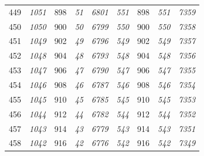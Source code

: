 \documentclass[10pt,fleqn]{article}
\begin{document}
\begin{longtable}{c|cccccccc}
449 & {\color{blue} \it 1051 \rm} & {\color{black} 898} & {\color{blue} \it 51 \rm} & {\color{blue} \it 6801 \rm} & {\color{blue} \it 551 \rm} & {\color{black} 898} & {\color{blue} \it 551 \rm} & {\color{blue} \it 7359 \rm} \\
450 & {\color{blue} \it 1050 \rm} & {\color{black} 900} & {\color{blue} \it 50 \rm} & {\color{blue} \it 6799 \rm} & {\color{blue} \it 550 \rm} & {\color{black} 900} & {\color{blue} \it 550 \rm} & {\color{blue} \it 7358 \rm} \\
451 & {\color{blue} \it 1049 \rm} & {\color{black} 902} & {\color{blue} \it 49 \rm} & {\color{blue} \it 6796 \rm} & {\color{blue} \it 549 \rm} & {\color{black} 902} & {\color{blue} \it 549 \rm} & {\color{blue} \it 7357 \rm} \\
452 & {\color{blue} \it 1048 \rm} & {\color{black} 904} & {\color{blue} \it 48 \rm} & {\color{blue} \it 6793 \rm} & {\color{blue} \it 548 \rm} & {\color{black} 904} & {\color{blue} \it 548 \rm} & {\color{blue} \it 7356 \rm} \\
453 & {\color{blue} \it 1047 \rm} & {\color{black} 906} & {\color{blue} \it 47 \rm} & {\color{blue} \it 6790 \rm} & {\color{blue} \it 547 \rm} & {\color{black} 906} & {\color{blue} \it 547 \rm} & {\color{blue} \it 7355 \rm} \\
454 & {\color{blue} \it 1046 \rm} & {\color{black} 908} & {\color{blue} \it 46 \rm} & {\color{blue} \it 6787 \rm} & {\color{blue} \it 546 \rm} & {\color{black} 908} & {\color{blue} \it 546 \rm} & {\color{blue} \it 7354 \rm} \\
455 & {\color{blue} \it 1045 \rm} & {\color{black} 910} & {\color{blue} \it 45 \rm} & {\color{blue} \it 6785 \rm} & {\color{blue} \it 545 \rm} & {\color{black} 910} & {\color{blue} \it 545 \rm} & {\color{blue} \it 7353 \rm} \\
456 & {\color{blue} \it 1044 \rm} & {\color{black} 912} & {\color{blue} \it 44 \rm} & {\color{blue} \it 6782 \rm} & {\color{blue} \it 544 \rm} & {\color{black} 912} & {\color{blue} \it 544 \rm} & {\color{blue} \it 7352 \rm} \\
457 & {\color{blue} \it 1043 \rm} & {\color{black} 914} & {\color{blue} \it 43 \rm} & {\color{blue} \it 6779 \rm} & {\color{blue} \it 543 \rm} & {\color{black} 914} & {\color{blue} \it 543 \rm} & {\color{blue} \it 7351 \rm} \\
458 & {\color{blue} \it 1042 \rm} & {\color{black} 916} & {\color{blue} \it 42 \rm} & {\color{blue} \it 6776 \rm} & {\color{blue} \it 542 \rm} & {\color{black} 916} & {\color{blue} \it 542 \rm} & {\color{blue} \it 7349 \rm} \\

\end{longtable}
\end{document}
